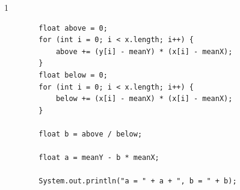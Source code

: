 \documentclass{article}
\begin{document}
\begin{ukon-infie}[01.11.17]{1}
\begin{exercise}[p=7.5]{}
\begin{verbatim}
        float above = 0;
        for (int i = 0; i < x.length; i++) {
            above += (y[i] - meanY) * (x[i] - meanX);
        }
        float below = 0;
        for (int i = 0; i < x.length; i++) {
            below += (x[i] - meanX) * (x[i] - meanX);
        }

        float b = above / below;

        float a = meanY - b * meanX;

        System.out.println("a = " + a + ", b = " + b);
\end{verbatim}
\newpage
{}
\end{exercise}


\end{ukon-infie}
\end{document}

